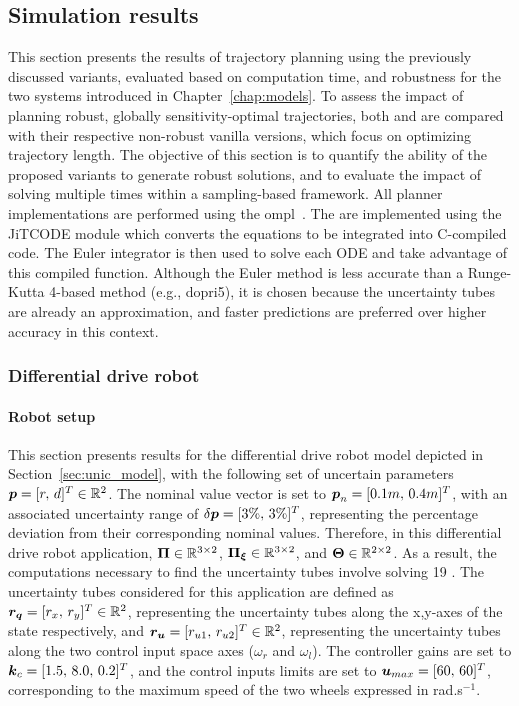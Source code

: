 \subsection{Simulation results}\label{sec:samp_simu}

This section presents the results of trajectory planning using the previously discussed variants, evaluated based on computation time, and robustness for the two systems introduced in Chapter~\ref{chap:models}.
To assess the impact of planning robust, globally sensitivity-optimal trajectories, both  and  are compared with their respective non-robust vanilla versions, which focus on optimizing trajectory length.
The objective of this section is to quantify the ability of the proposed variants to generate robust solutions, and to evaluate the impact of solving  multiple times within a sampling-based framework.
All planner implementations are performed using the \gls{ompl}~\cite{cOMPL}.
The  are implemented using the JiTCODE \cite{cJit} module which converts the equations to be integrated into C-compiled code.
The Euler integrator is then used to solve each ODE and take advantage of this compiled function.
Although the Euler method is less accurate than a Runge-Kutta 4-based method (e.g., dopri5),  it is chosen because the uncertainty tubes are already an approximation, and faster predictions are preferred over higher accuracy in this context.

\subsubsection{Differential drive robot}

\paragraph{Robot setup}

This section presents results for the differential drive robot model depicted in Section~\ref{sec:unic_model}, with the following set of uncertain parameters $\boldsymbol{p} = [r, \, d]^T \in \mathbb{R}^{2}$.
The nominal value vector is set to $\boldsymbol{p}_n = [0.1m, \, 0.4m]^T$, with an associated uncertainty range of $\delta\boldsymbol{p} = [3\%, \, 3\%]^T$, representing the percentage deviation from their corresponding nominal values.
Therefore, in this differential drive robot application, $\boldsymbol{\Pi} \in \mathbb{R}^{3\times2}$, $\boldsymbol{\Pi_{\xi}}\in \mathbb{R}^{3\times2}$, and $\boldsymbol{\Theta} \in \mathbb{R}^{2\times2}$.
As a result, the computations necessary to find the uncertainty tubes involve solving 19 .
The uncertainty tubes considered for this application are defined as $\boldsymbol{r_q} = [r_x, \, r_y]^T \in \mathbb{R}^2$, representing the uncertainty tubes along the x,y-axes of the state respectively, and $\boldsymbol{r_u} = [r_{u1}, \, r_{u2}]^T \in \mathbb{R}^2$, representing the uncertainty tubes along the two control input space axes ($\omega_r$ and $\omega_l$).
The controller gains are set to $\boldsymbol{k}_c = [1.5, \, 8.0, \, 0.2]^T$, and the control inputs limits are set to $\boldsymbol{u}_{max} = [60, \, 60]^T$, corresponding to the maximum speed of the two wheels expressed in rad.s$^{-1}$.

